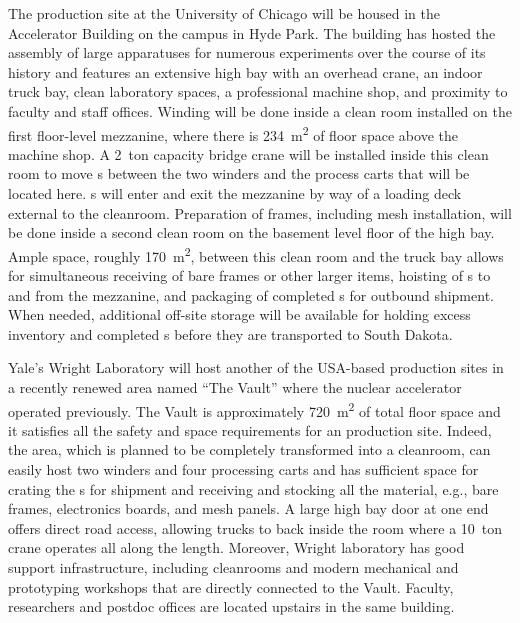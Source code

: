 The  production site at the University of Chicago will be housed in the Accelerator Building on the campus in Hyde Park.  The building has hosted the assembly of large apparatuses for numerous experiments over the course of its history and features an extensive high bay with an overhead crane, an indoor truck bay, clean laboratory spaces, a professional machine shop, and proximity to faculty and staff offices.  Winding will be done inside a clean room installed on the first floor-level mezzanine, where there is \SI{234}{m^2} of floor space above the machine shop.  A \SI{2}{ton} capacity bridge crane will be installed inside this clean room to move s %
between the two winders and the process carts that will be located here.  s will enter and exit the mezzanine by way of a loading deck external to the cleanroom.  Preparation of  frames, including mesh installation, will be done inside a second clean room on the basement level floor of the high bay.  Ample space, roughly \SI{170}{m^2}, between this clean room and the truck bay allows for simultaneous receiving of bare frames or other larger items, hoisting of s to and from the mezzanine, and packaging of completed s for outbound shipment.  When needed, additional off-site storage will be available for holding excess inventory and completed s before they are transported to South Dakota.

Yale's Wright Laboratory will host another of the USA-based  production sites in a recently renewed area named ``The Vault'' where the nuclear accelerator operated previously.  The Vault is approximately \SI{720}{m^2} of total floor space and it satisfies all the safety and space requirements for an  production site. 
Indeed, the area, which is planned to be completely transformed into a cleanroom, can easily host two winders and four processing carts and has sufficient space for crating the 
s for shipment and receiving and stocking all the material, e.g., bare frames, electronics boards, and mesh panels. A large high bay door at one end offers direct road access, allowing trucks to back inside the room where a \SI{10}{ton} crane operates all along the length.  Moreover, Wright laboratory has good support infrastructure, including cleanrooms and modern mechanical and prototyping workshops that are directly connected to the Vault. Faculty, researchers and postdoc offices are located upstairs in the same building. %

